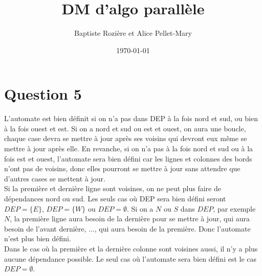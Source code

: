 \documentclass[a4paper,11pt]{article}
\title{DM d'algo parallèle}
\author{Baptiste Rozière et Alice Pellet-Mary}
\date{\today}
\begin{document}
\maketitle



\section*{Question 5}
L'automate est bien définit si on n'a pas dans DEP à la fois nord et sud, ou bien à la fois ouest et est. Si on a nord et sud ou est et ouest, on aura une boucle, chaque case devra se mettre à jour après ses voisins qui devront eux même se mettre à jour après elle.
En revanche, si on n'a pas à la fois nord et sud ou à la fois est et ouest, l'automate sera bien défini car les lignes et colonnes des bords n'ont pas de voisins, donc elles pourront se mettre à jour sans attendre que d'autres cases se mettent à jour.\\
Si la première et dernière ligne sont voisines, on ne peut plus faire de dépendances nord ou sud. Les seuls cas où DEP sera bien défini seront $DEP = \{E\}$, $DEP = \{W\}$ ou $DEP = \emptyset$. Si on a $N$ ou $S$ dans $DEP$, par exemple $N$, la première ligne aura besoin de la dernière pour se mettre à jour, qui aura besoin de l'avant dernière, ..., qui aura besoin de la première. Donc l'automate n'est plus bien défini.\\
Dans le cas où la première et la dernière colonne sont voisines aussi, il n'y a plus aucune dépendance possible. Le seul cas où l'automate sera bien défini est le cas $DEP = \emptyset$.
\end{document}
